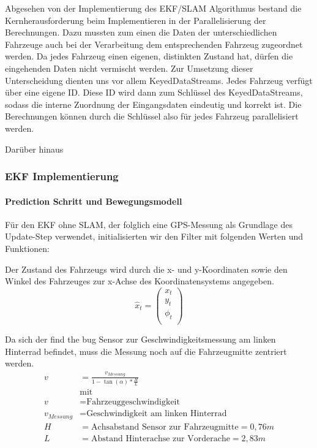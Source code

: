 \documentclass[11pt]{article}
\begin{document}
Abgesehen von der Implementierung des EKF/SLAM Algorithmus bestand die Kernherausforderung beim Implementieren in der Parallelisierung der Berechnungen. Dazu mussten zum einen die Daten der unterschiedlichen Fahrzeuge auch bei der Verarbeitung dem entsprechenden Fahrzeug zugeordnet werden. Da jedes Fahrzeug einen eigenen, distinkten Zustand hat, dürfen die eingehenden Daten nicht vermischt werden. Zur Umsetzung dieser Unterscheidung dienten uns vor allem KeyedDataStreams. Jedes Fahrzeug verfügt über eine eigene ID. Diese ID wird dann zum Schlüssel des KeyedDataStreams, sodass die interne Zuordnung der Eingangsdaten eindeutig und korrekt ist. Die Berechnungen können durch die Schlüssel also für jedes Fahrzeug parallelisiert werden.

Darüber hinaus

\subsubsection{EKF Implementierung}
\paragraph{Prediction Schritt und Bewegungsmodell}
Für den EKF ohne SLAM, der folglich eine GPS-Messung als Grundlage des Update-Step verwendet, initialisierten wir den Filter mit folgenden Werten und Funktionen:

Der Zustand des Fahrzeugs wird durch die x- und y-Koordinaten sowie den Winkel des Fahrzeuges zur x-Achse des Koordinatensystems angegeben.
\begin{equation}\label{EKF-State-Vector}
	\hat{x}_t = \begin{pmatrix}
		x_t \\
		y_t \\
		\phi_t \\
	  \end{pmatrix}
\end{equation}

Da sich der find the bug Sensor zur Geschwindigkeitsmessung am linken Hinterrad befindet, muss die Messung noch auf die Fahrzeugmitte zentriert werden.
\begin{equation}\label{Geschwindikeit}
\begin{split}
	v &= \frac{v_{Messung}}{1-\tan(\alpha)*\frac{H}{L}} \\
	&\text{mit } \\
	v &= \text{Fahrzeuggeschwindigkeit} \\
	v_{Messung} &= \text{Geschwindigkeit am linken Hinterrad} \\
	H &= \text{Achsabstand Sensor zur Fahrzeugmitte} = 0,76m \\
	L &= \text{Abstand Hinterachse zur Vorderache} = 2,83m
\end{split}
\end{equation}
\end{document}
